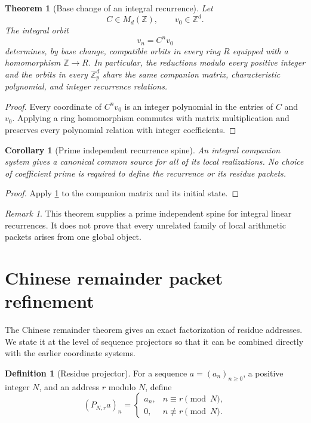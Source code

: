 \documentclass{aomart}
\newtheorem{theorem}{Theorem}[section]
\newtheorem{corollary}[corollary]{Corollary}
\theoremstyle{definition}
\newtheorem{definition}[definition]{Definition}
\theoremstyle{remark}
\newtheorem{remark}[remark]{Remark}
\newcommand{\ZZ}{\mathbb Z}
\newcommand{\Zp}{\mathbb Z_p}
\begin{document}
\begin{theorem}[Base change of an integral recurrence]\label{thm:integral_recurrence_spine}
Let
\[
C\in M_d(\ZZ),
\qquad
v_0\in\ZZ^d.
\]
The integral orbit
\[
v_n=C^nv_0
\]
determines, by base change, compatible orbits in every ring \(R\) equipped with a homomorphism \(\ZZ\to R\). In particular, the reductions modulo every positive integer and the orbits in every \(\Zp^d\) share the same companion matrix, characteristic polynomial, and integer recurrence relations.
\end{theorem}

\begin{proof}
Every coordinate of \(C^nv_0\) is an integer polynomial in the entries of \(C\) and \(v_0\). Applying a ring homomorphism commutes with matrix multiplication and preserves every polynomial relation with integer coefficients.
\end{proof}

\begin{corollary}[Prime independent recurrence spine]\label{cor:prime_independent_spine}
An integral companion system gives a canonical common source for all of its local realizations. No choice of coefficient prime is required to define the recurrence or its residue packets.
\end{corollary}

\begin{proof}
Apply \cref{thm:integral_recurrence_spine} to the companion matrix and its initial state.
\end{proof}

\begin{remark}\label{rem:spine_boundary}
This theorem supplies a prime independent spine for integral linear recurrences. It does not prove that every unrelated family of local arithmetic packets arises from one global object.
\end{remark}

\section{Chinese remainder packet refinement}\label{sec:crt}

The Chinese remainder theorem gives an exact factorization of residue addresses. We state it at the level of sequence projectors so that it can be combined directly with the earlier coordinate systems.

\begin{definition}[Residue projector]\label{def:residue_projector}
For a sequence \(a=(a_n)_{n\geq0}\), a positive integer \(N\), and an address \(r\) modulo \(N\), define
\[
(P_{N,r}a)_n
=
\begin{cases}
a_n,&n\equiv r\pmod N,\\
0,&n\not\equiv r\pmod N.
\end{cases}
\]
\end{definition}
\end{document}
